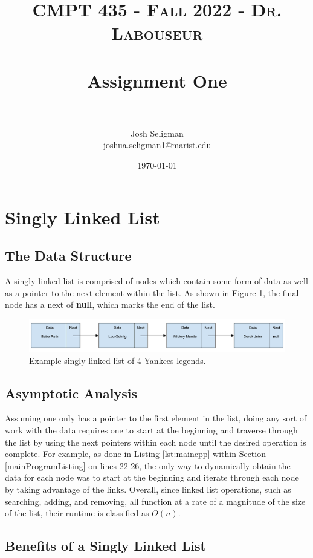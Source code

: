 \documentclass[letterpaper, 10pt,DIV=13]{scrartcl}
\title{	
   \normalfont \normalsize 
   \textsc{CMPT 435 - Fall 2022 - Dr. Labouseur} \\[10pt] %
   \horrule{0.5pt} \\[0.25cm] 	%
   \huge Assignment One  \\     	    %
   \horrule{0.5pt} \\[0.25cm] 	%
}
\author{Josh Seligman \\ \normalsize joshua.seligman1@marist.edu}
\date{\normalsize\today} 	%
\numberwithin{equation}{section} %
\numberwithin{figure}{section} %
\numberwithin{table}{section} %
\begin{document}
\maketitle %

\section{Singly Linked List}\label{linkedListSection}
\subsection{The Data Structure}\label{linkedListDataStructure}
A singly linked list is comprised of nodes which contain some form of data as well as a pointer to the next element within the list. As shown in Figure \ref{figure:linkedList}, the final node has a next of \textbf{null}, which marks the end of the list.

\begin{figure}[ht] 
    \centering 
    \includegraphics[width=15cm]{linkedList}
    \caption{Example singly linked list of 4 Yankees legends.}
    \label{figure:linkedList}
 \end{figure}

\subsection{Asymptotic Analysis}
Assuming one only has a pointer to the first element in the list, doing any sort of work with the data requires one to start at the beginning and traverse through the list by using the next pointers within each node until the desired operation is complete. For example, as done in Listing \ref{lst:maincpp} within Section \ref{mainProgramListing} on lines 22-26, the only way to dynamically obtain the data for each node was to start at the beginning and iterate through each node by taking advantage of the links. Overall, since linked list operations, such as searching, adding, and removing, all function at a rate of a magnitude of the size of the list, their runtime is classified as $O(n)$.

\subsection{Benefits of a Singly Linked List}
\end{document}
